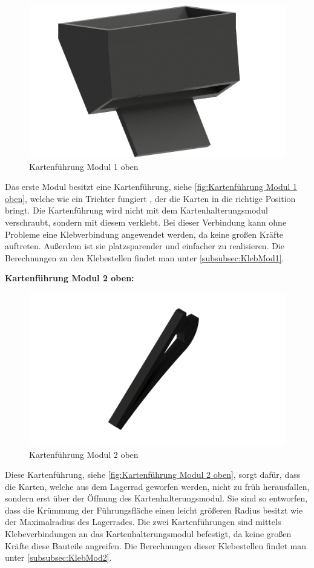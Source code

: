 \begin{figure}
    \includegraphics[width=8 cm]{fig/mech/KarteneinlaufNeu}
    \caption{Kartenführung Modul 1 oben}
    \label{fig:Kartenführung Modul 1 oben}
\end{figure}
Das erste Modul besitzt eine Kartenführung, siehe \autoref{fig:Kartenführung Modul 1 oben}, welche wie ein Trichter fungiert , der die Karten in die richtige Position bringt.
Die Kartenführung wird nicht mit dem Kartenhalterungsmodul verschraubt, sondern mit diesem verklebt.
Bei dieser Verbindung kann ohne Probleme eine Klebverbindung angewendet werden, da keine großen Kräfte auftreten.
Außerdem ist sie platzsparender und einfacher zu realisieren.
Die Berechnungen zu den Klebestellen findet man unter \autoref{subsubsec:KlebMod1}.

\pagebreak
\textbf{Kartenführung Modul 2 oben:}

\begin{figure}
    \includegraphics[width=7 cm]{fig/mech/StopperOben}
    \caption{Kartenführung Modul 2 oben}
    \label{fig:Kartenführung Modul 2 oben}
\end{figure}
Diese Kartenführung, siehe \autoref{fig:Kartenführung Modul 2 oben}, sorgt dafür, dass die Karten, welche aus dem Lagerrad geworfen werden, nicht zu früh herausfallen,
sondern erst über der Öffnung des Kartenhalterungsmodul.
Sie sind so entworfen, dass die Krümmung der Führungsfläche einen leicht größeren Radius besitzt wie der Maximalradius des Lagerrades.
Die zwei Kartenführungen sind mittels Klebeverbindungen an das Kartenhalterungsmodul befestigt, da keine großen Kräfte diese Bauteile angreifen.
Die Berechnungen dieser Klebestellen findet man unter \autoref{subsubsec:KlebMod2}. \\



